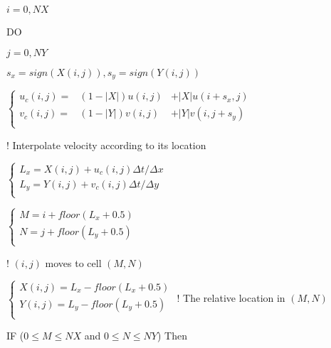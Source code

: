 \documentclass{article}
\theoremstyle{plain}\newtheorem{definition}{\sc{Definition}}
\theoremstyle{defination}\newtheorem{example}{Example}[section]
\numberwithin{equation}{section}
\numberwithin{table}{section}
\begin{document}
{{{ 
 { \color{black!80} $i=0,NX$}

\hspace{1.1cm} {\color{black!60!blue!80}DO}
{ \color{black!80} $j=0,NY$

\vspace{0.1cm}
 \hspace{1.5cm} $s_x=sign(X(i,j)), s_y=sign(Y(i,j))$

 \hspace{1.5cm}	$\left\{
  \begin{array}{rlr}
u_c(i,j)=&(1-|X|)u(i,j)&+|X|u(i+s_x,j)\\
v_c(i,j)=&(1-|Y|)v(i,j)&+|Y|v(i,j+s_y)\\
	\end{array}
  \right.$}
 \hspace{0.8cm}
   \color{black!60} ! Interpolate velocity according to its location \color{black!80}

 \hspace{1.5cm}	$\left\{
  \begin{array}{l}
	L_x=X(i,j)+u_c(i,j)\Delta t/ \Delta x\\
    L_y=Y(i,j)+v_c(i,j)\Delta t/ \Delta y\\
	\end{array}
	\right.$

 \hspace{1.5cm}	$\left\{
  \begin{array}{l}
	M=i+floor(L_x+0.5)\\
    N=j+floor(L_y+0.5)\\
	\end{array}
  \right.$}
  { \color{black!60} \hspace{3.4cm}
! $(i,j)$ moves to cell $(M,N)$} {\color{black!80}

 \hspace{1.5cm}	$\left\{
  \begin{array}{l}
	X(i,j)=L_x-floor(L_x+0.5)\\
    Y(i,j)=L_y-floor(L_y+0.5)\\
	\end{array}
	\right.$
	{ \color{black!60} \hspace{2.6cm}
! The relative location in $(M,N)$} {\color{black!80}

\vspace{0.1cm}
\hspace{1.5cm} \color{black!60!blue!80} IF
\color{black!70} ($0 \leqslant M \leqslant NX$ and $0 \leqslant N \leqslant NY$)
\color{black!60!blue!80} Then
\color{black!80}
\vspace{0.1cm}

}}}}
\end{document}
